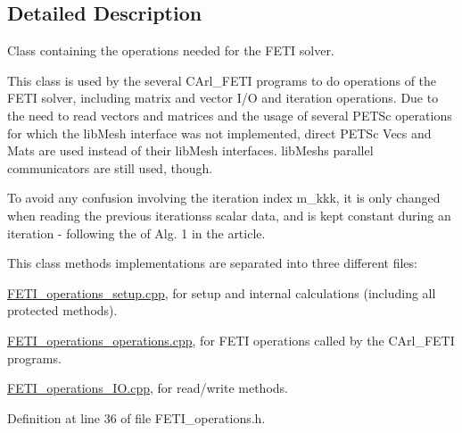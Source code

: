 \subsection{Detailed Description}
Class containing the operations needed for the F\+E\+T\+I solver. 

This class is used by the several {\ttfamily C\+Arl\+\_\+\+F\+E\+T\+I} programs to do operations of the F\+E\+T\+I solver, including matrix and vector I/\+O and iteration operations. Due to the need to read vectors and matrices and the usage of several P\+E\+T\+Sc operations for which the lib\+Mesh interface was not implemented, direct P\+E\+T\+Sc {\ttfamily Vec}\textquotesingle{}s and {\ttfamily Mat}\textquotesingle{}s are used instead of their lib\+Mesh interfaces. lib\+Mesh\textquotesingle{}s parallel communicators are still used, though.

To avoid any confusion involving the iteration index {\ttfamily m\+\_\+kkk}, it is only changed when reading the previous iterations\textquotesingle{}s scalar data, and is kept constant during an iteration -\/ following the of Alg. 1 in the article.

This class methods\textquotesingle{} implementations are separated into three different files\+:
\begin{DoxyItemize}
\item \hyperlink{_f_e_t_i__operations__setup_8cpp}{F\+E\+T\+I\+\_\+operations\+\_\+setup.\+cpp}, for setup and internal calculations (including all {\ttfamily protected} methods).
\item \hyperlink{_f_e_t_i__operations__operations_8cpp}{F\+E\+T\+I\+\_\+operations\+\_\+operations.\+cpp}, for F\+E\+T\+I operations called by the {\ttfamily C\+Arl\+\_\+\+F\+E\+T\+I} programs.
\item \hyperlink{_f_e_t_i__operations___i_o_8cpp}{F\+E\+T\+I\+\_\+operations\+\_\+\+I\+O.\+cpp}, for read/write methods. 
\end{DoxyItemize}

Definition at line 36 of file F\+E\+T\+I\+\_\+operations.\+h.



